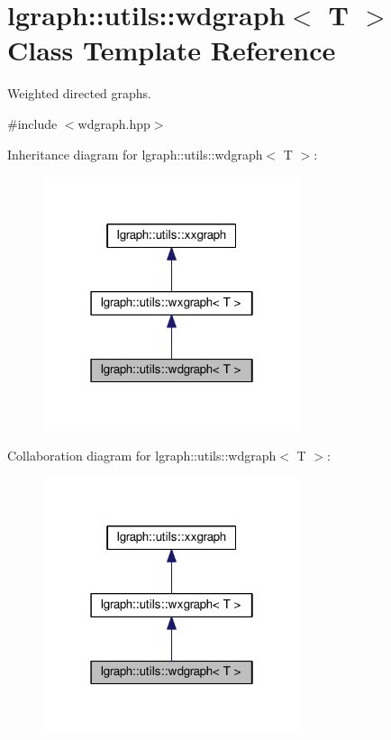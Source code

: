 \hypertarget{classlgraph_1_1utils_1_1wdgraph}{}\section{lgraph\+:\+:utils\+:\+:wdgraph$<$ T $>$ Class Template Reference}
\label{classlgraph_1_1utils_1_1wdgraph}


Weighted directed graphs.  




{\ttfamily \#include $<$wdgraph.\+hpp$>$}



Inheritance diagram for lgraph\+:\+:utils\+:\+:wdgraph$<$ T $>$\+:\nopagebreak
\begin{figure}[H]
\begin{center}
\leavevmode
\includegraphics[width=214pt]{classlgraph_1_1utils_1_1wdgraph__inherit__graph}
\end{center}
\end{figure}


Collaboration diagram for lgraph\+:\+:utils\+:\+:wdgraph$<$ T $>$\+:\nopagebreak
\begin{figure}[H]
\begin{center}
\leavevmode
\includegraphics[width=214pt]{classlgraph_1_1utils_1_1wdgraph__coll__graph}
\end{center}
\end{figure}
